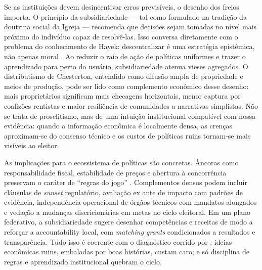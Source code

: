 Se as instituições devem desincentivar erros previsíveis, o desenho dos freios importa. O princípio da subsidiariedade — tal como formulado na tradição da doutrina social da Igreja — recomenda que decisões sejam tomadas no nível mais próximo do indivíduo capaz de resolvê-las. Isso conversa diretamente com o problema do conhecimento de Hayek: descentralizar é uma estratégia epistêmica, não apenas moral \cite{hayek_knowledge_use}. Ao reduzir o raio de ação de políticas uniformes e trazer o aprendizado para perto do usuário, subsidiariedade atenua vieses agregados. O distributismo de Chesterton, entendido como difusão ampla de propriedade e meios de produção, pode ser lido como complemento econômico desse desenho: mais proprietários significam mais checagens horizontais, menor captura por coalizões rentistas e maior resiliência de comunidades a narrativas simplistas. Não se trata de proselitismo, mas de uma intuição institucional compatível com nossa evidência: quando a informação econômica é localmente densa, as crenças aproximam-se do consenso técnico e os custos de políticas ruins tornam-se mais visíveis ao eleitor.

As implicações para o ecossistema de políticas são concretas. Âncoras como responsabilidade fiscal, estabilidade de preços e abertura à concorrência preservam o caráter de “regras do jogo” \cite{north1990institutions}. Complementos densos podem incluir cláusulas de \textit{sunset} regulatório, avaliação ex ante de impacto com padrões de evidência, independência operacional de órgãos técnicos com mandatos alongados e vedação a mudanças discricionárias em metas no ciclo eleitoral. Em um plano federativo, a subsidiariedade sugere desenhar competências e receitas de modo a reforçar a accountability local, com \textit{matching grants} condicionados a resultados e transparência. Tudo isso é coerente com o diagnóstico corrido por : ideias econômicas ruins, embaladas por boas histórias, custam caro; e só disciplina de regras e aprendizado institucional quebram o ciclo.

